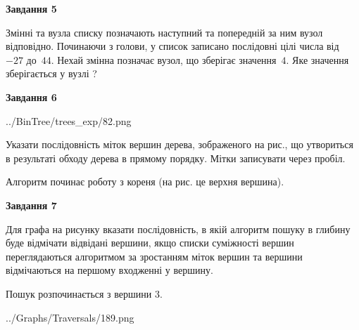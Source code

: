 \documentclass[12pt, ukrainian]{article}
\begin{document}
{\begin {large}
{\begin {center}\textbf{Завдання 5}\end {center}}\par
Змінні  та  вузла списку позначають наступний та попередній за ним вузол відповідно. Починаючи з голови, у список записано послідовні цілі числа від~$-27$ до~$44$. Нехай змінна  позначає вузол, що зберігає значення~$4$.
Яке значення зберігається у вузлі  ?\par
\newpage

{\begin {center}\textbf{Завдання 6}\end {center}}\par

\begin{center}
	{../BinTree/trees_exp/82.png}
\end{center}
Указати послідовність міток вершин дерева, зображеного на рис., що утвориться в результаті обходу дерева в прямому порядку. Мітки записувати через пробіл.\par Алгоритм починає роботу з кореня (на рис. це верхня вершина).\par
\newpage

{\begin {center}\textbf{Завдання 7}\end {center}}\par
Для графа на рисунку вказати послідовність, в якій алгоритм пошуку в глибину буде відмічати відвідані вершини, якщо списки суміжності вершин переглядаються алгоритмом за зростанням міток вершин та вершини відмічаються на першому вход\-женні у вершину.\par
Пошук розпочинається з вершини 3.\par

\begin{center}
	{../Graphs/Traversals/189.png}
\end{center}\par
\newpage


\end{large}}
\end{document}

